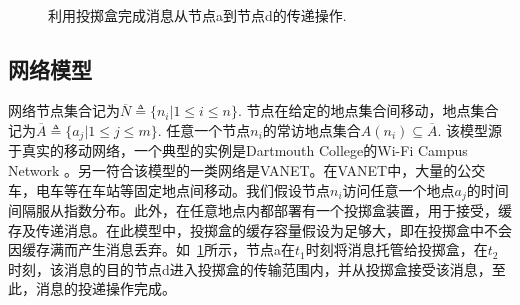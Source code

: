 \begin{figure}
\centering
{}~~~~~~
\caption{利用投掷盒完成消息从节点a到节点d的传递操作.}
\label{fig:chap3_box}
\end{figure}

\subsection{网络模型}

网络节点集合记为$\overline{N}\triangleq\{n_i|1\leq i\leq n\}$. 节点在给定的地点集合间移动，地点集合记为$\overline{A}\triangleq\{a_j|1\leq j \leq m\}$. 任意一个节点$n_i$的常访地点集合$A(n_i)\subseteq \overline{A}$. 该模型源于真实的移动网络，一个典型的实例是Dartmouth College的Wi-Fi Campus Network 。另一符合该模型的一类网络是VANET。在VANET中，大量的公交车，电车等在车站等固定地点间移动。我们假设节点$n_i$访问任意一个地点$a_j$的时间间隔服从指数分布。此外，在任意地点内都部署有一个投掷盒装置，用于接受，缓存及传递消息。在此模型中，投掷盒的缓存容量假设为足够大，即在投掷盒中不会因缓存满而产生消息丢弃。如\figurename~\ref{fig:chap3_box}所示，节点a在$t_1$时刻将消息托管给投掷盒，在$t_2$时刻，该消息的目的节点d进入投掷盒的传输范围内，并从投掷盒接受该消息，至此，消息的投递操作完成。

